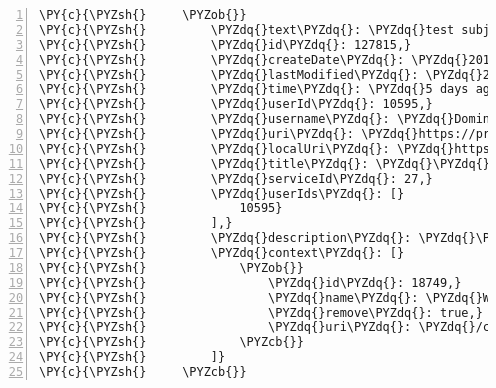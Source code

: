 \begin{Verbatim}[fontsize=\scriptsize,commandchars=\\\{\},numbers=left,firstnumber=1,stepnumber=1]
\PY{c}{\PYZsh{}     \PYZob{}}
\PY{c}{\PYZsh{}         \PYZdq{}text\PYZdq{}: \PYZdq{}test subject\PYZdq{},}
\PY{c}{\PYZsh{}         \PYZdq{}id\PYZdq{}: 127815,}
\PY{c}{\PYZsh{}         \PYZdq{}createDate\PYZdq{}: \PYZdq{}2014\PYZhy{}04\PYZhy{}19 16:27:45\PYZdq{},}
\PY{c}{\PYZsh{}         \PYZdq{}lastModified\PYZdq{}: \PYZdq{}2014\PYZhy{}04\PYZhy{}19 16:27:45\PYZdq{},}
\PY{c}{\PYZsh{}         \PYZdq{}time\PYZdq{}: \PYZdq{}5 days ago\PYZdq{},}
\PY{c}{\PYZsh{}         \PYZdq{}userId\PYZdq{}: 10595,}
\PY{c}{\PYZsh{}         \PYZdq{}username\PYZdq{}: \PYZdq{}Dominic Bosch\PYZdq{},}
\PY{c}{\PYZsh{}         \PYZdq{}uri\PYZdq{}: \PYZdq{}https://probinder.com/content/view/id/127815/\PYZdq{},}
\PY{c}{\PYZsh{}         \PYZdq{}localUri\PYZdq{}: \PYZdq{}https://probinder.com/content/view/id/127815/\PYZdq{},}
\PY{c}{\PYZsh{}         \PYZdq{}title\PYZdq{}: \PYZdq{}\PYZdq{},}
\PY{c}{\PYZsh{}         \PYZdq{}serviceId\PYZdq{}: 27,}
\PY{c}{\PYZsh{}         \PYZdq{}userIds\PYZdq{}: [}
\PY{c}{\PYZsh{}             10595}
\PY{c}{\PYZsh{}         ],}
\PY{c}{\PYZsh{}         \PYZdq{}description\PYZdq{}: \PYZdq{}\PYZdq{},}
\PY{c}{\PYZsh{}         \PYZdq{}context\PYZdq{}: [}
\PY{c}{\PYZsh{}             \PYZob{}}
\PY{c}{\PYZsh{}                 \PYZdq{}id\PYZdq{}: 18749,}
\PY{c}{\PYZsh{}                 \PYZdq{}name\PYZdq{}: \PYZdq{}WebAPI ECA Test Binder\PYZdq{},}
\PY{c}{\PYZsh{}                 \PYZdq{}remove\PYZdq{}: true,}
\PY{c}{\PYZsh{}                 \PYZdq{}uri\PYZdq{}: \PYZdq{}/content/context/id/18749/webapi\PYZhy{}eca\PYZhy{}test\PYZhy{}binder\PYZdq{}}
\PY{c}{\PYZsh{}             \PYZcb{}}
\PY{c}{\PYZsh{}         ]}
\PY{c}{\PYZsh{}     \PYZcb{}}
\end{Verbatim}









\clearpage
